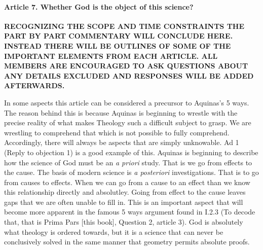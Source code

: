 \documentclass{ucetd}
\begin{document}
\paragraph{Article 7. Whether God is the object of this science?}
\begin{center}
    \textbf{RECOGNIZING THE SCOPE AND TIME CONSTRAINTS THE PART BY PART COMMENTARY WILL CONCLUDE HERE. INSTEAD THERE WILL BE OUTLINES OF SOME OF THE IMPORTANT ELEMENTS FROM EACH ARTICLE. ALL MEMBERS ARE ENCOURAGED TO ASK QUESTIONS ABOUT ANY DETAILS EXCLUDED AND RESPONSES WILL BE ADDED AFTERWARDS.}\\
\end{center}
\normalsize
In some aspects this article can be considered a precursor to Aquinas's 5 ways. The reason behind this is because Aquinas is beginning to wrestle with the precise reality of what makes Theology such a difficult subject to grasp. We are wrestling to comprehend that which is not possible to fully comprehend. Accordingly, there will always be aspects that are simply unknowable. Ad 1 (Reply to objection 1) is a good example of this. Aquinas is beginning to describe how the science of God must be an \textit{a priori} study. That is we go from effects to the cause. The basis of modern science is \textit{a posteriori} investigations. That is to go from causes to effects. When we can go from a cause to an effect than we know this relationship directly and absolutley. Going from effect to the cause leaves gaps that we are often unable to fill in. This is an important aspect that will become more apparent in the famous 5 ways argument found in I.2.3 (To decode that, that is Prima Pars [this book], Question 2, article 3). God is absolutely what theology is ordered towards, but it is a science that can never be conclusively solved in the same manner that geometry permits absolute proofs.
\end{document}
